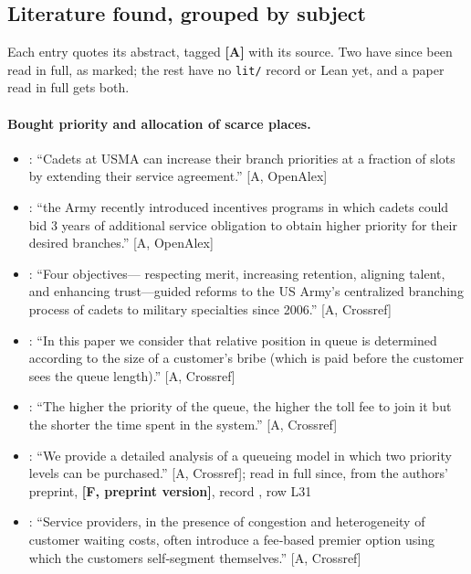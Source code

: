\documentclass[11pt,a4paper]{article}
\newcommand{\aq}[2]{``#2''}
\begin{document}
\subsection{Literature found, grouped by subject}

Each entry quotes its abstract, tagged \textbf{[A]} with its source. Two have
since been read in full, as marked; the rest have no \texttt{lit/} record or
Lean yet, and a paper read in full gets both.

\paragraph{Bought priority and allocation of scarce places.}
\begin{itemize}
\item \citet{SonmezSwitzer2013}: \aq{SonmezSwitzer2013}{Cadets at USMA can increase their branch priorities at a fraction of slots by extending their service agreement.} [A, OpenAlex]
\item \citet{Sonmez2013}: \aq{Sonmez2013}{the Army recently introduced incentives programs in which cadets could bid 3 years of additional service obligation to obtain higher priority for their desired branches.} [A, OpenAlex]
\item \citet{GreenbergPathakSonmez2024}: \aq{GreenbergPathakSonmez2024}{Four objectives— respecting merit, increasing retention, aligning talent, and enhancing trust—guided reforms to the US Army’s centralized branching process of cadets to military specialties since 2006.} [A, Crossref]
\item \citet{Kleinrock1967}: \aq{Kleinrock1967}{In this paper we consider that relative position in queue is determined according to the size of a customer’s bribe (which is paid before the customer sees the queue length).} [A, Crossref]
\item \citet{AdiriYechiali1974}: \aq{AdiriYechiali1974}{The higher the priority of the queue, the higher the toll fee to join it but the shorter the time spent in the system.} [A, Crossref]
\item \citet{HassinHaviv1997}: \aq{HassinHaviv1997}{We provide a detailed analysis of a queueing model in which two priority levels can be purchased.} [A, Crossref]; read in full since, from the authors' preprint, \textbf{[F, preprint version]}, record , row L31
\item \citet{GavirneniKulkarni2016}: \aq{GavirneniKulkarni2016}{Service providers, in the presence of congestion and heterogeneity of customer waiting costs, often introduce a fee‐based premier option using which the customers self‐segment themselves.} [A, Crossref]

\end{itemize}
\end{document}
